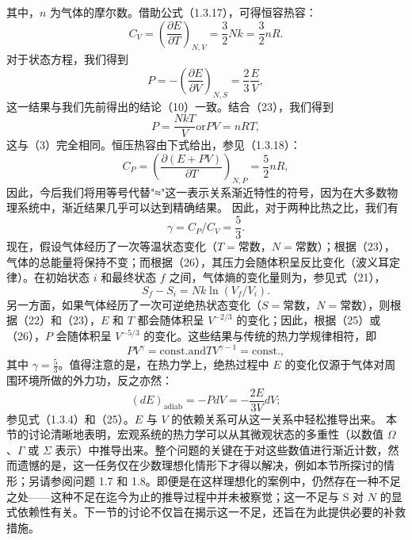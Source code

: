 其中，\(n\) 为气体的摩尔数。借助公式（1.3.17），可得恒容热容：
\begin{equation}\tag{1.3.44}\label{eq:1.3.44}
C _ { V } = \left( \frac { \partial E } { \partial T } \right) _ { N , V } = \frac { 3 } { 2 } N k = \frac { 3 } { 2 } n R .
\end{equation}
对于状态方程，我们得到
\begin{equation}\tag{1.3.45}\label{eq:1.3.45}
P = - \left( \frac { \partial E } { \partial V } \right) _ { N , S } = \frac { 2 } { 3 } \frac { E } { V } ,
\end{equation}
这一结果与我们先前得出的结论（10）一致。结合（23），我们得到
\begin{equation}\tag{1.3.46}\label{eq:1.3.46}
P = { \frac { N k T } { V } }  { \mathrm { o r } }  P V = n R T ,
\end{equation}
这与（3）完全相同。恒压热容由下式给出，参见（1.3.18）：
\begin{equation}\tag{1.3.47}\label{eq:1.3.47}
C _ { P } = \left( \frac { \partial ( E + P V ) } { \partial T } \right) _ { N , P } = \frac { 5 } { 2 } n R ,
\end{equation}
因此，今后我们将用等号代替"≈"这一表示关系渐近特性的符号，因为在大多数物理系统中，渐近结果几乎可以达到精确结果。
因此，对于两种比热之比，我们有
\begin{equation}\tag{1.3.48}\label{eq:1.3.48}
\gamma = C _ { P } / C _ { V } = \frac { 5 } { 3 } .
\end{equation}
现在，假设气体经历了一次等温状态变化（\(T=\mathrm{常数}\)，\(N=\mathrm{常数}\)）；根据（23），气体的总能量将保持不变；而根据（26），其压力会随体积呈反比变化（波义耳定律）。在初始状态 \(i\) 和最终状态 \(f\) 之间，气体熵的变化量则为，参见式（21），
\begin{equation}\tag{1.3.49}\label{eq:1.3.49}
S _ { f } - S _ { i } = N k \ln ( V _ { f } / V _ { i } ) .
\end{equation}
另一方面，如果气体经历了一次可逆绝热状态变化（\(S=\mathrm{常数}\)，\(N=\mathrm{常数}\)），则根据（22）和（23），\(E\) 和 \(T\) 都会随体积呈 \(V^{-2/3}\) 的变化；因此，根据（25）或（26），\(P\) 会随体积呈 \(V^{-5/3}\) 的变化。这些结果与传统的热力学规律相符，即
\begin{equation}\tag{1.3.50}\label{eq:1.3.50}
P V ^{\gamma} = \mathrm { c o n s t . }  \mathrm { a n d }  T V ^{\gamma - 1} = \mathrm { c o n s t . } ,
\end{equation}
其中 \(\gamma=\frac{5}{3}\)。值得注意的是，在热力学上，绝热过程中 \(E\) 的变化仅源于气体对周围环境所做的外力功，反之亦然：
\begin{equation}\tag{1.3.51}\label{eq:1.3.51}
( d E ) _ { \mathrm { a d i a b } } = - P d V = - \frac { 2 E } { 3 V } d V ;
\end{equation}
参见式（1.3.4）和（25）。\(E\) 与 \(V\) 的依赖关系可从这一关系中轻松推导出来。
本节的讨论清晰地表明，宏观系统的热力学可以从其微观状态的多重性（以数值 \(\Omega\)、\(\Gamma\) 或 \(\Sigma\) 表示）中推导出来。整个问题的关键在于对这些数值进行渐近计数，然而遗憾的是，这一任务仅在少数理想化情形下才得以解决，例如本节所探讨的情形；另请参阅问题 1.7 和 1.8。即便是在这样理想化的案例中，仍然存在一种不足之处——这种不足在迄今为止的推导过程中并未被察觉；这一不足与 S 对 \(N\) 的显式依赖性有关。下一节的讨论不仅旨在揭示这一不足，还旨在为此提供必要的补救措施。
